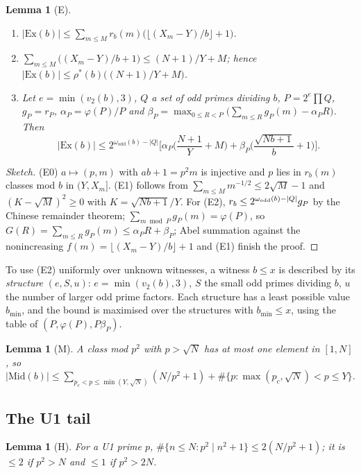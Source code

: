 \documentclass[11pt]{amsart}
\newtheorem{lemma}[theorem]{Lemma}
\theoremstyle{definition}
\theoremstyle{remark}
\newcommand{\Mid}{\mathrm{Mid}}
\newcommand{\Ex}{\mathrm{Ex}}
\begin{document}
\begin{lemma}[E]\label{lem:E}
\begin{enumerate}[label=(E\arabic*),start=0]
\item $|\Ex(b)|\le\sum_{m\le M}r_b(m)\big(\lfloor(X_m-Y)/b\rfloor+1\big)$.
\item $\sum_{m\le M}\big((X_m-Y)/b+1\big)\le(N+1)/Y+M$; hence
  $|\Ex(b)|\le\rho^*(b)\big((N+1)/Y+M\big)$.
\item Let $e=\min(v_2(b),3)$, $Q$ a set of odd primes dividing $b$, $P=2^e\prod Q$,
  $g_P=r_P$, $\alpha_P=\varphi(P)/P$ and
  $\beta_P=\max_{0\le R<P}\big(\sum_{m\le R}g_P(m)-\alpha_PR\big)$. Then
  \[
  |\Ex(b)|\le2^{\omega_{\mathrm{odd}}(b)-|Q|}\Big[\alpha_P\Big(\frac{N+1}Y+M\Big)
  +\beta_P\Big(\frac{\sqrt{Nb+1}}b+1\Big)\Big].
  \]
\end{enumerate}
\end{lemma}

\begin{proof}[Sketch]
(E0) $a\mapsto(p,m)$ with $ab+1=p^2m$ is injective and $p$ lies in $r_b(m)$ classes
mod $b$ in $(Y,X_m]$. (E1) follows from $\sum_{m\le M}m^{-1/2}\le2\sqrt M-1$ and
$(K-\sqrt M)^2\ge0$ with $K=\sqrt{Nb+1}/Y$. For (E2), $r_b\le2^{\omega_{\rm odd}(b)-|Q|}g_P$
by the Chinese remainder theorem; $\sum_{m\bmod P}g_P(m)=\varphi(P)$, so
$G(R)=\sum_{m\le R}g_P(m)\le\alpha_PR+\beta_P$; Abel summation against the
nonincreasing $f(m)=\lfloor(X_m-Y)/b\rfloor+1$ and (E1) finish the proof.
\end{proof}

To use (E2) uniformly over unknown witnesses, a witness $b\le x$ is described by
its \emph{structure} $(e,S,u)$: $e=\min(v_2(b),3)$, $S$ the small odd primes
dividing $b$, $u$ the number of larger odd prime factors. Each structure has a
least possible value $b_{\min}$, and the bound is maximised over the structures
with $b_{\min}\le x$, using the table of $(P,\varphi(P),P\beta_P)$.

\begin{lemma}[M]
A class mod $p^2$ with $p>\sqrt N$ has at most one element in $[1,N]$, so
$|\Mid(b)|\le\sum_{p_c<p\le\min(Y,\sqrt N)}(N/p^2+1)+\#\{p:\max(p_c,\sqrt N)<p\le Y\}$.
\end{lemma}

\subsection{The U1 tail}
\begin{lemma}[H]
For a U1 prime $p$, $\#\{n\le N: p^2\mid n^2+1\}\le2(N/p^2+1)$; it is $\le2$ if
$p^2>N$ and $\le1$ if $p^2>2N$.
\end{lemma}
\end{document}
